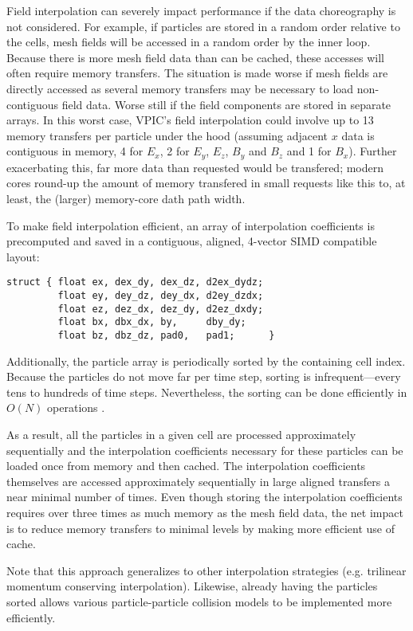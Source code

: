 \documentclass[letter,10pt]{article}
\begin{document}
Field interpolation can severely impact performance if the data
choreography is not considered.  For example, if particles are stored
in a random order relative to the cells, mesh fields will be accessed
in a random order by the inner loop.  Because there is more mesh field
data than can be cached, these accesses will often require memory
transfers.  The situation is made worse if mesh fields are directly
accessed as several memory transfers may be necessary to load
non-contiguous field data.  Worse still if the field components are
stored in separate arrays.  In this worst case, VPIC's field
interpolation could involve up to 13 memory transfers per particle
under the hood (assuming adjacent $x$ data is contiguous in memory, 4
for $E_x$, 2 for $E_y$, $E_z$, $B_y$ and $B_z$ and 1 for $B_x$).
Further exacerbating this, far more data than requested would be
transfered; modern cores round-up the amount of memory transfered in
small requests like this to, at least, the (larger) memory-core dath
path width.

To make field interpolation efficient, an array of interpolation
coefficients is precomputed and saved in a contiguous, aligned,
4-vector SIMD compatible layout:
\begin{verbatim}
struct { float ex, dex_dy, dex_dz, d2ex_dydz;
         float ey, dey_dz, dey_dx, d2ey_dzdx;
         float ez, dez_dx, dez_dy, d2ez_dxdy;
         float bx, dbx_dx, by,     dby_dy;
         float bz, dbz_dz, pad0,   pad1;      }
\end{verbatim}
Additionally, the particle array is periodically sorted by the
containing cell index.  Because the particles do not move far per time
step, sorting is infrequent---every tens to hundreds of time steps.
Nevertheless, the sorting can be done efficiently in $O(N)$ operations
\cite{Bowers_2001}.

As a result, all the particles in a given cell are processed
approximately sequentially and the interpolation coefficients
necessary for these particles can be loaded once from memory and then
cached.  The interpolation coefficients themselves are accessed
approximately sequentially in large aligned transfers a near minimal
number of times.  Even though storing the interpolation coefficients
requires over three times as much memory as the mesh field data, the
net impact is to reduce memory transfers to minimal levels by making
more efficient use of cache.

Note that this approach generalizes to other interpolation strategies
(e.g. trilinear momentum conserving interpolation).  Likewise, already
having the particles sorted allows various particle-particle
collision models to be implemented more efficiently.  
\end{document}
